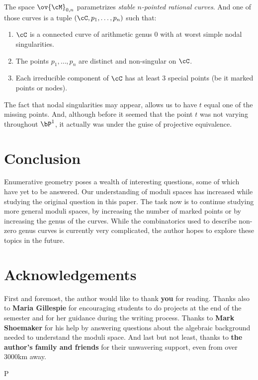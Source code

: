\documentclass[12pt]{memoir}
\def\nextra {P}
\begin{document}
    \begin{Def}
        The space $\ov{\cM}_{0,n}$ parametrizes \emph{stable $n$-pointed rational curves}. And one of those curves is a tuple $(\cC,p_1,\dots,p_n)$ such that:
        \begin{enumerate}
            \itemsep=-0.4em
            \item $\cC$ is a connected curve of arithmetic genus 0 with at worst simple nodal singularities.
            \item The points $p_1,\dots,p_n$ are distinct and non-singular on $\cC$.
            \item Each irreducible component of $\cC$ has at least $3$ special points (be it marked points or nodes).
        \end{enumerate}
    \end{Def}
    
    The fact that nodal singularities may appear, allows us to have $t$ equal one of the missing points. And, although before it seemed that the point $t$ was not varying throughout $\bP^1$, it actually was under the guise of projective equivalence.
    
    \section{Conclusion}
    
    Enumerative geometry poses a wealth of interesting questions, some of which have yet to be answered. Our understanding of moduli spaces has increased while studying the original question in this paper. The task now is to continue studying more general moduli spaces, by increasing the number of marked points or by increasing the genus of the curves. While the combinatorics used to describe non-zero genus curves is currently very complicated, the author hopes to explore these topics in the future.
    
    \section{Acknowledgements}
    
    First and foremost, the author would like to thank \textbf{you} for reading. Thanks also to \textbf{Maria Gillespie} for encouraging students to do projects at the end of the semester and for her guidance during the writing process. Thanks to \textbf{Mark Shoemaker} for his help by answering questions about the algebraic background needed to understand the moduli space. And last but not least, thanks to \textbf{the author's family and friends} for their unwavering support, even from over 3000km away. 
    
\ifx\nextra\undefined
\printindex
\else\fi
\nocite{*}


\end{document}
